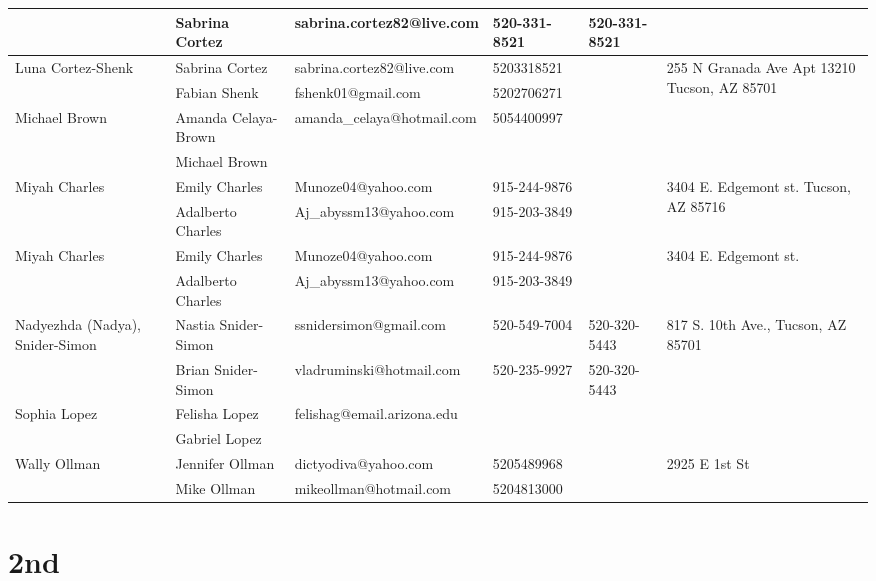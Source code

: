 \documentclass[landscape]{article}\usepackage[]{graphicx}\usepackage[]{color}
\begin{document}
\begin{longtable}{|p{100pt}|p{100pt}|p{140pt}|p{60pt}|p{64pt}|p{120pt}|}
 & Sabrina Cortez & sabrina.cortez82@live.com & 520-331-8521 & 520-331-8521 & \\
\hline
\multirow{2}{100pt}{Luna Cortez-Shenk} & Sabrina Cortez & sabrina.cortez82@live.com & 5203318521 &  & \multirow{2}{120pt}{255 N Granada Ave Apt 13210 Tucson, AZ 85701} \\
 & Fabian Shenk & fshenk01@gmail.com & 5202706271 &  & \\
\hline
\multirow{2}{100pt}{Michael Brown} & Amanda Celaya-Brown & amanda\_celaya@hotmail.com & 5054400997 &  & \multirow{2}{120pt}{} \\
 & Michael Brown &  &  &  & \\
\hline
\multirow{2}{100pt}{Miyah Charles} & Emily Charles & Munoze04@yahoo.com & 915-244-9876 &  & \multirow{2}{120pt}{3404 E. Edgemont st. Tucson, AZ 85716} \\
 & Adalberto Charles & Aj\_abyssm13@yahoo.com & 915-203-3849 &  & \\
\hline
\multirow{2}{100pt}{Miyah Charles} & Emily Charles & Munoze04@yahoo.com & 915-244-9876 &  & \multirow{2}{120pt}{3404 E. Edgemont st.} \\
 & Adalberto Charles & Aj\_abyssm13@yahoo.com & 915-203-3849 &  & \\
\hline
\multirow{2}{100pt}{Nadyezhda (Nadya), Snider-Simon} & Nastia Snider-Simon & ssnidersimon@gmail.com & 520-549-7004 & 520-320-5443 & \multirow{2}{120pt}{817 S. 10th Ave., Tucson, AZ 85701} \\
 & Brian Snider-Simon & vladruminski@hotmail.com & 520-235-9927 & 520-320-5443 & \\
\hline
\multirow{2}{100pt}{Sophia Lopez} & Felisha Lopez & felishag@email.arizona.edu &  &  & \multirow{2}{120pt}{} \\
 & Gabriel Lopez &  &  &  & \\
\hline
\multirow{2}{100pt}{Wally Ollman} & Jennifer Ollman & dictyodiva@yahoo.com & 5205489968 &  & \multirow{2}{120pt}{2925 E 1st St} \\
 & Mike Ollman & mikeollman@hotmail.com & 5204813000 &  & \\
\hline
\end{longtable}
\newpage
\section{2nd}
\end{document}
